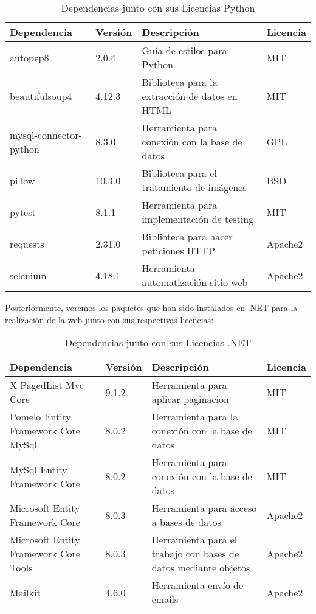 \begin{table}[H]
    \centering
    \renewcommand{\arraystretch}{1.2} %
    \begin{tabularx}{\textwidth}{l l X l}
        \hline
        \textbf{Dependencia} & \textbf{Versión} & \textbf{Descripción} & \textbf{Licencia} \\
        \hline
        autopep8 & 2.0.4 & Guía de estilos para Python & MIT \\
        beautifulsoup4 & 4.12.3 & Biblioteca para la extracción de datos en HTML & MIT \\
        mysql-connector-python & 8.3.0 & Herramienta para conexión con la base de datos & GPL \\
        pillow & 10.3.0 & Biblioteca para el tratamiento de imágenes & BSD \\
        pytest & 8.1.1 & Herramienta para implementación de testing & MIT \\
        requests & 2.31.0 & Biblioteca para hacer peticiones HTTP & Apache2 \\
        selenium & 4.18.1 & Herramienta automatización sitio web & Apache2 \\
        \hline
    \end{tabularx}
    \caption{Dependencias junto con sus Licencias Python}
    \label{tab:licencias1}
\end{table}

\newpage
Posteriormente, veremos los paquetes que han sido instalados en .NET para la realización de la web junto con sus respectivas licencias:

\begin{table}[H]
    \centering
    \renewcommand{\arraystretch}{1.2} %
    \begin{tabularx}{\textwidth}{X l X l}
        \hline
        \textbf{Dependencia} & \textbf{Versión} & \textbf{Descripción} & \textbf{Licencia} \\
        \hline
        X PagedList Mvc Core & 9.1.2 & Herramienta para aplicar paginación & MIT \\
        Pomelo Entity Framework Core MySql& 8.0.2 & Herramienta para la conexión con la base de datos & MIT \\
        MySql Entity Framework Core & 8.0.2 & Herramienta para conexión con la base de datos & MIT \\
        Microsoft
        Entity Framework Core & 8.0.3 & Herramienta para acceso a bases de datos & Apache2 \\
        Microsoft Entity Framework Core Tools & 8.0.3 & Herramienta para el trabajo con bases de datos mediante objetos & Apache2 \\
        Mailkit & 4.6.0 & Herramienta envío de emails & Apache2 \\
        \hline
    \end{tabularx}
    \caption{Dependencias junto con sus Licencias .NET}
    \label{tab:licencias2}
\end{table}

